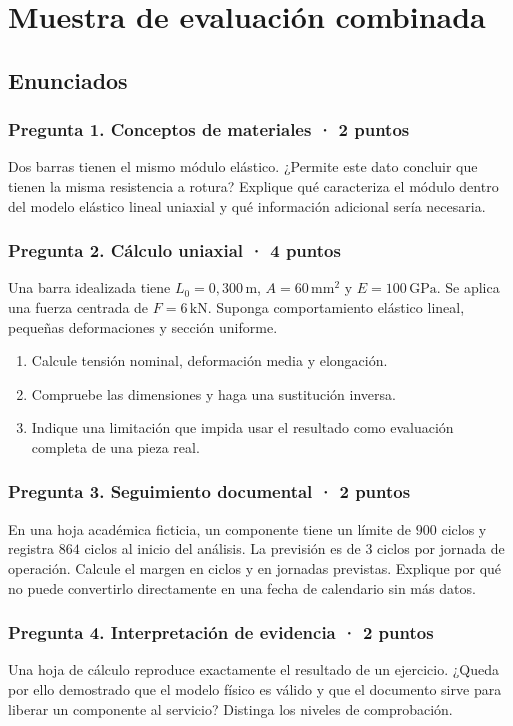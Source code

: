 
\chapter{Muestra de evaluación combinada}
\section{Enunciados}
\subsection*{Pregunta 1. Conceptos de materiales · 2 puntos}
Dos barras tienen el mismo módulo elástico. ¿Permite este dato concluir que tienen la misma resistencia a rotura? Explique qué caracteriza el módulo dentro del modelo elástico lineal uniaxial y qué información adicional sería necesaria.

\subsection*{Pregunta 2. Cálculo uniaxial · 4 puntos}
Una barra idealizada tiene $L_0=0{,}300\,\mathrm{m}$, $A=60\,\mathrm{mm^2}$ y $E=100\,\mathrm{GPa}$. Se aplica una fuerza centrada de $F=6\,\mathrm{kN}$. Suponga comportamiento elástico lineal, pequeñas deformaciones y sección uniforme.
\begin{enumerate}
\item Calcule tensión nominal, deformación media y elongación.
\item Compruebe las dimensiones y haga una sustitución inversa.
\item Indique una limitación que impida usar el resultado como evaluación completa de una pieza real.
\end{enumerate}

\subsection*{Pregunta 3. Seguimiento documental · 2 puntos}
En una hoja académica ficticia, un componente tiene un límite de $900$ ciclos y registra $864$ ciclos al inicio del análisis. La previsión es de $3$ ciclos por jornada de operación. Calcule el margen en ciclos y en jornadas previstas. Explique por qué no puede convertirlo directamente en una fecha de calendario sin más datos.

\subsection*{Pregunta 4. Interpretación de evidencia · 2 puntos}
Una hoja de cálculo reproduce exactamente el resultado de un ejercicio. ¿Queda por ello demostrado que el modelo físico es válido y que el documento sirve para liberar un componente al servicio? Distinga los niveles de comprobación.

